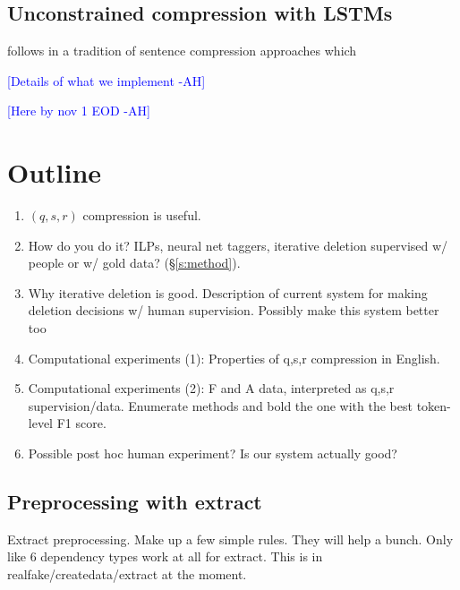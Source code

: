 \documentclass[11pt,a4paper]{article}
\newcommand{\ahcomment}[1]{\textcolor{blue}{[#1 -AH]}}
\begin{document}
\subsection{Unconstrained compression with LSTMs}

follows in a tradition of sentence compression approaches which

\ahcomment{Details of what we implement}


\ahcomment{Here by nov 1 EOD}

\section{Outline}
\begin{enumerate}
\item{$(q,s,r)$ compression is useful.}
\item{How do you do it? ILPs, neural net taggers, iterative deletion supervised w/ people or w/ gold data? (\S\ref{s:method}).}
\item{Why iterative deletion is good. Description of current system for making deletion decisions w/ human supervision. Possibly make this system better too}
\item{Computational experiments (1): Properties of q,s,r compression in English. }
\item{Computational experiments (2): F and A data, interpreted as q,s,r supervision/data. Enumerate methods and bold the one with the best token-level F1 score.}
\item{Possible post hoc human experiment? Is our system actually good?}
\end{enumerate}



\subsection{Preprocessing with extract}
Extract preprocessing. Make up a few simple rules. They will help a bunch. Only like 6 dependency types work at all for extract. This is in realfake/createdata/extract at the moment.
\end{document}
